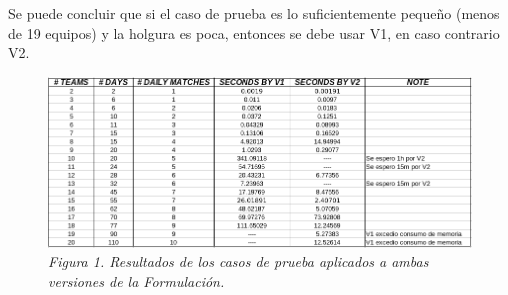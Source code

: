 \documentclass[a4paper,10pt]{article}
\begin{document}
  Se puede concluir que si el caso de prueba es lo suficientemente peque\~no
  (menos de 19 equipos) y la holgura es poca, entonces se debe usar V1, en caso 
  contrario V2. \\


\begin{figure}[t!]
  \centering
  \includegraphics[scale=2.5]{resultados.png}\\
  \small{\textit{Figura 1. Resultados de los casos de prueba aplicados a ambas 
  versiones de la Formulaci\'on.}}\\
\end{figure}
\end{document}
